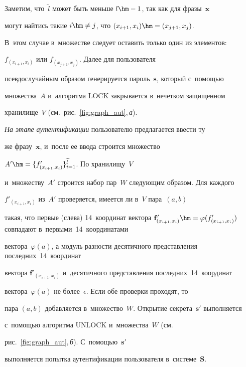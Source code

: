 Заметим, что~$\widetilde{l}$ может быть меньше $l\hm-1$, так как для фразы~$\mathbf{x}$ 


могут найтись такие $i\hm\neq j$, что $(x_{i+1},x_i)\hm=(x_{j+1},x_j)$. 


В~этом случае в~множестве следует оставить только один из элементов: 


$f_{(x_{i+1},x_i)}$ или $f_{(x_{j+1},x_j)}$. Далее для пользователя 


псевдослучайным образом генерируется пароль~$\mathbf{s}$, который с~помощью 


множества~$A$ и~алгоритма $\mathrm{LOCK}$ закрывается в~нечетком защищенном 


хранилище~$V$ (см.\ рис.~\ref{fig:graph_aut},\,\textit{а}).





\textit{На этапе аутентификации} пользователю предлагается ввести ту 


же фразу~$\mathbf{x}$, и~после ее ввода строится множество 


$A'\hm=\{f'_{(x_{i+1},x_i)}\}_{i=1}^{\widetilde{l}}$. По хранилищу~$V$ 


и~множеству~$A'$ строится набор пар~$W$ следующим образом. Для каждого 


$f'_{(x_{i+1},x_i)}$ из~$A'$ проверяется, имеется ли в~$V$ пара~$(a,b)$ 


такая, что первые (слева) 14~координат вектора $\mathbf{f}'_{(x_{i+1},x_i)}


\hm=\varphi({f}'_{(x_{i+1},x_i)})$ совпадают в~первыми~14~координатами 


вектора~$\varphi({a})$, а модуль разности десятичного представления последних~14~координат 


вектора $\mathbf{f}'_{(x_{i+1},x_i)}$ и~десятичного представления последних~14~координат 


вектора~$\varphi({a})$ не более~$\epsilon$. Если  обе проверки проходят, то 


пара $(a,b)$ добавляется в~множество~$W$. Открытие секрета~$\mathbf{s}'$ выполняется 


с~помощью алгоритма $\mathrm{UNLOCK}$ и~множества~$W$ (см.\ 


рис.~\ref{fig:graph_aut},\,\textit{б}). С~помощью~$\mathbf{s}'$ 


выполняется попытка аутентификации пользователя в~системе~$\mathbf{S}$.





